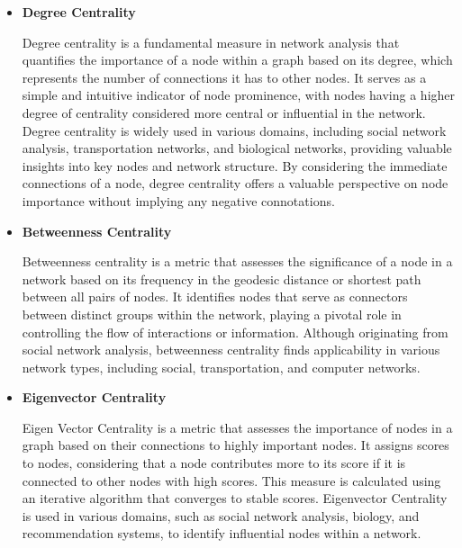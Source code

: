 \documentclass{article}
\begin{document}
\begin{itemize}

\item \textbf{Degree Centrality}

Degree centrality is a fundamental measure in network analysis that quantifies the importance of a node within a graph based on its degree, which represents the number of connections it has to other nodes. It serves as a simple and intuitive indicator of node prominence, with nodes having a higher degree of centrality considered more central or influential in the network. Degree centrality is widely used in various domains, including social network analysis, transportation networks, and biological networks, providing valuable insights into key nodes and network structure. By considering the immediate connections of a node, degree centrality offers a valuable perspective on node importance without implying any negative connotations.

\item \textbf{Betweenness Centrality}

Betweenness centrality is a metric that assesses the significance of a node in a network based on its frequency in the geodesic distance or shortest path between all pairs of nodes. It identifies nodes that serve as connectors between distinct groups within the network, playing a pivotal role in controlling the flow of interactions or information. Although originating from social network analysis, betweenness centrality finds applicability in various network types, including social, transportation, and computer networks.

\item \textbf{Eigenvector Centrality}

Eigen Vector Centrality is a metric that assesses the importance of nodes in a graph based on their connections to highly important nodes. It assigns scores to nodes, considering that a node contributes more to its score if it is connected to other nodes with high scores. This measure is calculated using an iterative algorithm that converges to stable scores. Eigenvector Centrality is used in various domains, such as social network analysis, biology, and recommendation systems, to identify influential nodes within a network.

\end{itemize}
\end{document}
